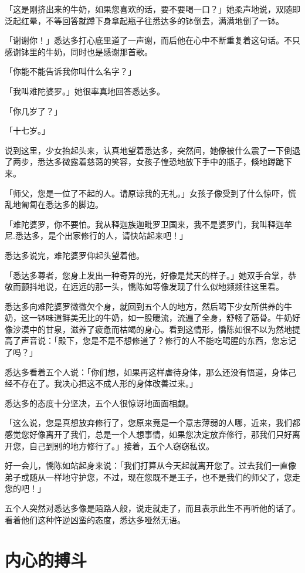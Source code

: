\documentclass[twoside,openany]{book}
\begin{document}
「这是刚挤出来的牛奶，如果您喜欢的话，要不要喝一口？」她柔声地说，双随即泛起红晕，不等回答就蹲下身拿起瓶子往悉达多的钵倒去，满满地倒了一钵。

「谢谢你！」悉达多打心底里道了一声谢，而后他在心中不断重复着这句话。不只感谢钵里的牛奶，同时也是感谢那首歌。

「你能不能告诉我你叫什么名字？」

「我叫难陀婆罗。」她很率真地回答悉达多。

「你几岁了？」

「十七岁。」

说到这里，少女抬起头来，认真地望着悉达多，突然间，她像被什么震了一下倒退了两步，悉达多微露着慈蔼的笑容，女孩子惶恐地放下手中的瓶子，倏地蹲跪下来。

「师父，您是一位了不起的人。请原谅我的无礼。」女孩子像受到了什么惊吓，慌乱地匍匐在悉达多的脚边。

「难陀婆罗，你不要怕。我从释迦族迦毗罗卫国来，我不是婆罗门，我叫释迦牟尼.悉达多，是个出家修行的人，请快站起来吧！」

悉达多说完，难陀婆罗仰起头望着他。

「悉达多尊者，您身上发出一种奇异的光，好像是梵天的样子。」她双手合掌，恭敬而颤抖地说，在远远的那一头，憍陈如等像发现了什么似地频频往这里看。

悉达多向难陀婆罗微微欠个身，就回到五个人的地方，然后喝下少女所供养的牛奶，这一钵味道鲜美无比的牛奶，如一股暖流，流遍了全身，舒畅了筋骨。牛奶好像沙漠中的甘泉，滋养了疲惫而枯竭的身心。看到这情形，憍陈如很不以为然地提高了声音说：「殿下，您是不是不想修道了？修行的人不能吃喝腥的东西，您忘记了吗？」

悉达多看着五个人说：「你们想，如果再这样虐待身体，那么还没有悟道，身体己经不存在了。我决心把这不成人形的身体改善过来。」

悉达多的态度十分坚决，五个人很惊讶地面面相觑。

「这么说，您是真想放弃修行了，您原来竟是一个意志薄弱的人哪，近来，我们都感觉您好像离开了我们，总是一个人想事情，如果您决定放弃修行，那我们只好离开您，自己到别的地方修行了。」接着，五个人窃窃私议。

好一会儿，憍陈如站起身来说：「我们打算从今天起就离开您了。过去我们一直像弟子或随从一样地守护您，不过，现在您既不是王子，也不是我们的师父了，您走您的吧！」

五个人突然对悉达多像是陌路人般，说走就走了，而且表示此生不再听他的话了。看着他们这种忤逆凶蛮的态度，悉达多哑然无语。

\section{内心的搏斗}\label{sec1.10}
\end{document}

